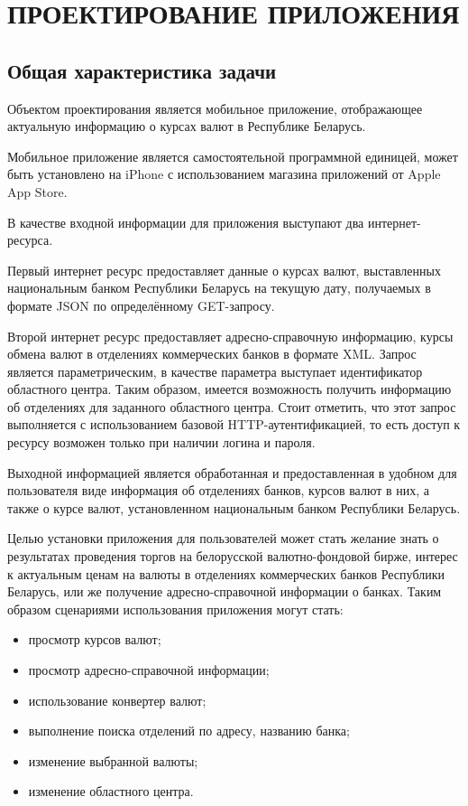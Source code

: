 \section[Проектирование приложения]{%
  ПРОЕКТИРОВАНИЕ ПРИЛОЖЕНИЯ
}

\label{sec:design}


\subsection{Общая характеристика задачи}

Объектом проектирования является мобильное приложение,
отображающее актуальную информацию о курсах валют в Республике Беларусь.

Мобильное приложение является самостоятельной программной единицей,
может быть установлено на iPhone с
использованием магазина приложений от Apple App Store.

В качестве входной информации для приложения выступают два интернет-ресурса.

Первый интернет ресурс предоставляет данные о курсах валют, выставленных
национальным банком Республики Беларусь на текущую дату,
получаемых в формате JSON по определённому GET-запросу.

Второй интернет ресурс предоставляет адресно-справочную информацию,
курсы обмена валют в отделениях коммерческих банков в формате XML. Запрос
является параметрическим, в качестве параметра выступает идентификатор
областного центра. Таким образом, имеется возможность получить информацию
об отделениях для заданного областного центра. Стоит отметить, что этот запрос
выполняется с использованием базовой HTTP-аутентификацией, то есть доступ
к ресурсу возможен только при наличии логина и пароля.

Выходной информацией является обработанная и предоставленная в удобном для
пользователя виде информация об отделениях банков, курсов валют в них,
а также о курсе валют, установленном национальным банком Республики Беларусь.

Целью установки приложения для пользователей может стать желание знать о
результатах проведения торгов на белорусской валютно-фондовой бирже,
интерес к актуальным ценам на валюты в отделениях коммерческих банков
Республики Беларусь, или же получение адресно-справочной информации о банках.
Таким образом сценариями использования приложения могут стать:
\begin{itemize}
  \item просмотр курсов валют;
  \item просмотр адресно-справочной информации;
  \item использование конвертер валют;
  \item выполнение поиска отделений по адресу, названию банка;
  \item изменение выбранной валюты;
  \item изменение областного центра.
\end{itemize}

